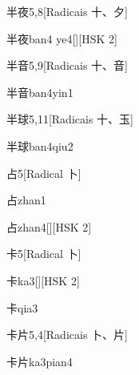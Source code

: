 \begin{entry}{半夜}{5,8}[Radicais ⼗、⼣]
  \begin{phonetics}{半夜}{ban4 ye4}[][HSK 2]
  \end{phonetics}
\end{entry}

\begin{entry}{半音}{5,9}[Radicais ⼗、⾳]
  \begin{phonetics}{半音}{ban4yin1}
  \end{phonetics}
\end{entry}

\begin{entry}{半球}{5,11}[Radicais ⼗、⽟]
  \begin{phonetics}{半球}{ban4qiu2}
  \end{phonetics}
\end{entry}

\begin{entry}{占}{5}[Radical ⼘]
  \begin{phonetics}{占}{zhan1}
  \end{phonetics}
  \begin{phonetics}{占}{zhan4}[][HSK 2]
  \end{phonetics}
\end{entry}

\begin{entry}{卡}{5}[Radical ⼘]
  \begin{phonetics}{卡}{ka3}[][HSK 2]
  \end{phonetics}
  \begin{phonetics}{卡}{qia3}
  \end{phonetics}
\end{entry}

\begin{entry}{卡片}{5,4}[Radicais ⼘、⽚]
  \begin{phonetics}{卡片}{ka3pian4}
  \end{phonetics}
\end{entry}

